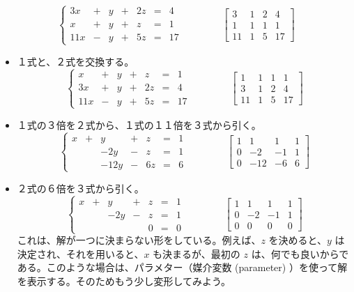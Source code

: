 $$\left\{\begin{array}{rrrrrrr}
3x & + & y  & + & 2z & = & 4\\
x & + & y & + & z & = & 1\\
11x & - & y & + & 5z & = & 17
\end{array}\right. \qquad\qquad 
\left[\begin{array}{rrrr}
3 & 1 & 2 & 4\\
1 & 1 & 1 &  1\\
11 & 1 & 5 & 17
\end{array}\right]$$
\begin{itemize}
\item １式と、２式を交換する。
$$\left\{\begin{array}{rrrrrrr}
x & + & y & + & z & = & 1\\
3x & + & y  & + & 2z & = & 4\\
11x & - & y & + & 5z & = & 17
\end{array}\right. \qquad\qquad  
\left[\begin{array}{rrrr}
1 & 1 & 1 &  1\\
3 & 1 & 2 & 4\\
11 & 1 & 5 & 17
\end{array}\right]$$
\item １式の３倍を２式から、１式の１１倍を３式から引く。
$$\left\{\begin{array}{rrrrrrr}
x & + & y & + & z & = & 1\\
 & & -2y  & - & z & = & 1\\
 &  & -12y & - & 6z & = & 6
\end{array}\right. \qquad\qquad  
\left[\begin{array}{rrrr}
1 & 1 & 1 &  1\\
0 & -2 & -1 & 1\\
0 & -12 & -6 & 6
\end{array}\right]$$
\item ２式の６倍を３式から引く。
$$\left\{\begin{array}{rrrrrrr}
x & + & y & + & z & = & 1\\
 & & -2y  & - & z & = & 1\\
 &  &  &  & 0 & = & 0
\end{array}\right. \qquad\qquad  
\left[\begin{array}{rrrr}
1 & 1 & 1 &  1\\
0 & -2 & -1 & 1\\
0 & 0 & 0 & 0
\end{array}\right]$$
これは、解が一つに決まらない形をしている。例えば、$z$ を決めると、$y$ は決定され、それを用いると、$x$ も決まるが、最初の $z$ は、何でも良いからである。このような場合は、パラメター（媒介変数 (parameter) ）を使って解を表示する。そのためもう少し変形してみよう。

\end{itemize}
